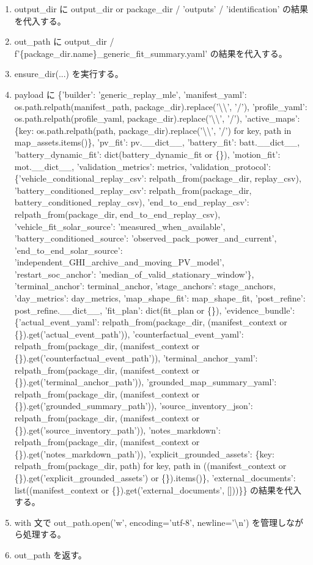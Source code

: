 \documentclass[a4paper,11pt]{article}
\begin{document}
            \begin{enumerate}[leftmargin=1.8em]
            \item output\_dir に output\_dir or package\_dir / 'outputs' / 'identification' の結果を代入する。
\item out\_path に output\_dir / f'\{package\_dir.name\}\_generic\_fit\_summary.yaml' の結果を代入する。
\item ensure\_dir(...) を実行する。
\item payload に \{'builder': 'generic\_replay\_mle', 'manifest\_yaml': os.path.relpath(manifest\_path, package\_dir).replace('\textbackslash{}\textbackslash{}', '/'), 'profile\_yaml': os.path.relpath(profile\_yaml, package\_dir).replace('\textbackslash{}\textbackslash{}', '/'), 'active\_maps': \{key: os.path.relpath(path, package\_dir).replace('\textbackslash{}\textbackslash{}', '/') for key, path in map\_assets.items()\}, 'pv\_fit': pv.\_\_dict\_\_, 'battery\_fit': batt.\_\_dict\_\_, 'battery\_dynamic\_fit': dict(battery\_dynamic\_fit or \{\}), 'motion\_fit': mot.\_\_dict\_\_, 'validation\_metrics': metrics, 'validation\_protocol': \{'vehicle\_conditional\_replay\_csv': relpath\_from(package\_dir, replay\_csv), 'battery\_conditioned\_replay\_csv': relpath\_from(package\_dir, battery\_conditioned\_replay\_csv), 'end\_to\_end\_replay\_csv': relpath\_from(package\_dir, end\_to\_end\_replay\_csv), 'vehicle\_fit\_solar\_source': 'measured\_when\_available', 'battery\_conditioned\_source': 'observed\_pack\_power\_and\_current', 'end\_to\_end\_solar\_source': 'independent\_GHI\_archive\_and\_moving\_PV\_model', 'restart\_soc\_anchor': 'median\_of\_valid\_stationary\_window'\}, 'terminal\_anchor': terminal\_anchor, 'stage\_anchors': stage\_anchors, 'day\_metrics': day\_metrics, 'map\_shape\_fit': map\_shape\_fit, 'post\_refine': post\_refine.\_\_dict\_\_, 'fit\_plan': dict(fit\_plan or \{\}), 'evidence\_bundle': \{'actual\_event\_yaml': relpath\_from(package\_dir, (manifest\_context or \{\}).get('actual\_event\_path')), 'counterfactual\_event\_yaml': relpath\_from(package\_dir, (manifest\_context or \{\}).get('counterfactual\_event\_path')), 'terminal\_anchor\_yaml': relpath\_from(package\_dir, (manifest\_context or \{\}).get('terminal\_anchor\_path')), 'grounded\_map\_summary\_yaml': relpath\_from(package\_dir, (manifest\_context or \{\}).get('grounded\_summary\_path')), 'source\_inventory\_json': relpath\_from(package\_dir, (manifest\_context or \{\}).get('source\_inventory\_path')), 'notes\_markdown': relpath\_from(package\_dir, (manifest\_context or \{\}).get('notes\_markdown\_path')), 'explicit\_grounded\_assets': \{key: relpath\_from(package\_dir, path) for key, path in ((manifest\_context or \{\}).get('explicit\_grounded\_assets') or \{\}).items()\}, 'external\_documents': list((manifest\_context or \{\}).get('external\_documents', []))\}\} の結果を代入する。
\item with 文で out\_path.open('w', encoding='utf-8', newline='\textbackslash{}n') を管理しながら処理する。
\item out\_path を返す。
            \end{enumerate}
\end{document}
